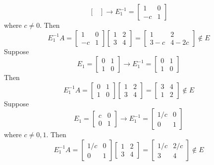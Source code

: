 \begin{itemize}
$$\begin{bmatrix}
\end{bmatrix} \rightarrow E_1^{-1} = \begin{bmatrix}
1 & 0 \\
-c & 1
\end{bmatrix}$$
where $c \neq 0$. Then
$$E_1^{-1}A = \begin{bmatrix}
1 & 0 \\
-c & 1
\end{bmatrix}\begin{bmatrix}
1 & 2 \\
3 & 4
\end{bmatrix} = \begin{bmatrix}
1 & 2 \\
3 - c & 4 - 2c
\end{bmatrix} \not \in E$$
Suppose
$$E_1 = \begin{bmatrix}
0 & 1 \\
1 & 0
\end{bmatrix} \rightarrow E_1^{-1} = \begin{bmatrix}
0 & 1 \\
1 & 0
\end{bmatrix}$$
Then
$$E_1^{-1}A = \begin{bmatrix}
0 & 1 \\
1 & 0
\end{bmatrix}\begin{bmatrix}
1 & 2 \\
3 & 4
\end{bmatrix} = \begin{bmatrix}
3 & 4 \\
1 & 2
\end{bmatrix} \not \in E$$
Suppose
$$E_1 = \begin{bmatrix}
c & 0 \\
0 & 1
\end{bmatrix} \rightarrow E_1^{-1} = \begin{bmatrix}
1/c & 0 \\
0 & 1
\end{bmatrix}$$
where $c \neq 0, 1$. Then
$$E_1^{-1}A = \begin{bmatrix}
1/c & 0 \\
0 & 1
\end{bmatrix}\begin{bmatrix}
1 & 2 \\
3 & 4
\end{bmatrix} = \begin{bmatrix}
1/c & 2/c \\
3 & 4
\end{bmatrix} \not \in E$$

\end{itemize}
